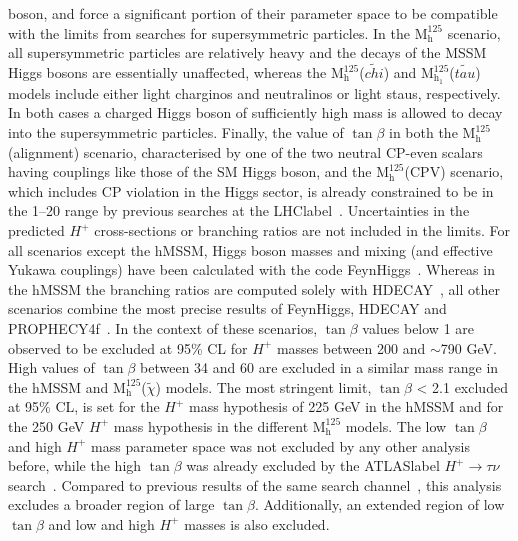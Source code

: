boson, and force a significant portion of their parameter space to be compatible with the limits from searches for supersymmetric particles. In the $\text{M}^{125}_\text{h}$ scenario, all supersymmetric particles are relatively heavy and the decays of the MSSM Higgs bosons are essentially unaffected, whereas the $\text{M}^{125}_\text{h}$($\tilde{chi}$) and $\text{M}^{125}_{\text{h}_1}$($\tilde{tau}$) models include either light charginos and neutralinos or light staus, respectively. In both cases a charged Higgs boson of sufficiently high mass is allowed to decay into the supersymmetric particles. Finally, the value of $\tan\beta$ in both the $\text{M}^{125}_\text{h}$(alignment) scenario, characterised by one of the two neutral CP-even scalars having couplings like those of the SM Higgs boson, and the $\text{M}^{125}_\text{h}$(CPV) scenario, which includes CP violation in the Higgs sector, is already constrained to be in the 1--20 range by previous searches at the \acrshort{LHClabel}~\cite{PhysRevD.91.075015}. Uncertainties in the predicted $H^+$ cross-sections or branching ratios are not included in the limits. For all scenarios except the hMSSM, Higgs boson masses and mixing (and effective Yukawa couplings) have been calculated with the code FeynHiggs~\cite{Heinemeyer_2000,Heinemeyer_1999,Degrassi_2003,Hahn_2014,Frank_2007,Bahl_2016,Bahl_2018}. Whereas in the hMSSM the branching ratios are computed solely with HDECAY~\cite{Djouadi_2019,Djouadi_1998}, all other scenarios combine the most precise results of FeynHiggs, HDECAY and PROPHECY4f~\cite{Bredenstein_2006,Bredenstein_2007}. In the context of these scenarios, $\tan\beta$ values below 1 are observed to be excluded at 95\% CL for $H^+$ masses between 200 and $\sim$790 GeV. High values of $\tan\beta$ between 34 and 60 are excluded in a similar mass range in the hMSSM and $\text{M}^{125}_\text{h}$($\tilde{\chi}$) models. The most stringent limit, $\tan\beta$ < 2.1 excluded at 95\% CL, is set for the $H^+$ mass hypothesis of 225 GeV in the hMSSM and for the 250 GeV $H^+$ mass hypothesis in the different $\text{M}^{125}_\text{h}$ models. The low $\tan\beta$ and high $H^+$ mass parameter space was not excluded by any other analysis before, while the high $\tan\beta$ was already excluded by the \acrshort{ATLASlabel} $H^+\to\tau\nu$ search~\cite{Hplustaunu16}. Compared to previous results of the same search channel~\cite{ATLASHptb2018}, this analysis excludes a broader region of large $\tan\beta$. Additionally, an extended region of low $\tan\beta$ and low and high $H^+$ masses is also excluded.

